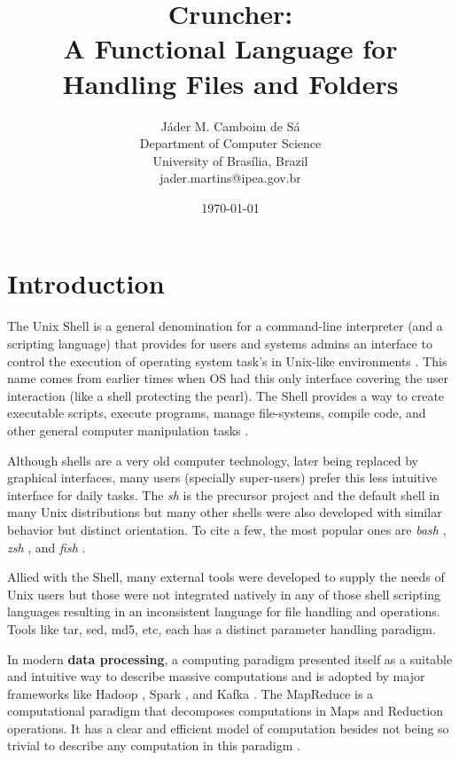\documentclass{article}
\title{Cruncher:\\
\large A Functional Language for Handling Files and Folders}
\author{Jáder M. Camboim de Sá \\
        Department of Computer Science\\
        University of Brasília, Brazil \\
        jader.martins@ipea.gov.br}
\date{\today}
\begin{document}
\maketitle

\section{Introduction}
\label{sec:intro}
The Unix Shell is a general denomination for a command-line interpreter
(and a scripting language) that provides for users and systems admins an
interface to control the execution of operating system task's in Unix-like
environments \cite{negus2010linux}. This name comes from earlier times
when OS had this only interface covering the user interaction (like a shell
protecting the pearl). The Shell provides a way to create executable scripts,
execute programs, manage file-systems, compile code, and other general computer
manipulation tasks \cite{negus2010linux,blum2008linux}.

Although shells are a very old computer technology, later being replaced by
graphical interfaces, many users (specially super-users) prefer this less
intuitive interface \cite{newham2005learning} for daily tasks. The \textit{sh}
is the precursor project and the default shell in many Unix distributions but
many other shells were also developed with similar behavior but distinct
orientation. To cite a few, the most popular ones are \textit{bash}
\cite{bash}, \textit{zsh} \cite{zsh}, and \textit{fish} \cite{fish}.

Allied with the Shell, many external tools were developed to supply the needs
of Unix users \cite{negus2010linux} but those were not integrated natively in
any of those shell scripting languages resulting in an inconsistent language for
file handling and operations. Tools like tar, sed, md5, etc, each has a
distinct parameter handling paradigm.

In modern \textbf{data processing}, a computing paradigm presented itself as a
suitable and intuitive way to describe massive computations and is adopted by
major frameworks like Hadoop \cite{white2012hadoop}, Spark
\cite{chambers2018spark}, and Kafka \cite{narkhede2017kafka}. The MapReduce is
a computational paradigm that decomposes computations in Maps and Reduction
operations. It has a clear and efficient model of computation besides not being
so trivial to describe any computation in this paradigm
\cite{afrati2012vision}.
\end{document}

